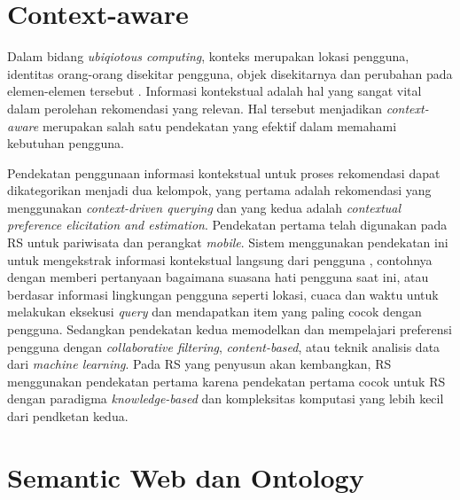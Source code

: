 \section{Context-aware}

Dalam bidang \textit{ubiqiotous computing}, konteks merupakan lokasi pengguna, identitas orang-orang disekitar pengguna, objek disekitarnya dan perubahan pada elemen-elemen tersebut \cite{ricci2011book}. Informasi kontekstual adalah hal yang sangat vital dalam perolehan rekomendasi yang relevan. Hal tersebut menjadikan \textit{context-aware} merupakan salah satu pendekatan yang efektif dalam memahami kebutuhan pengguna.

Pendekatan penggunaan informasi kontekstual untuk proses rekomendasi dapat dikategorikan menjadi dua kelompok, yang pertama adalah rekomendasi yang menggunakan \textit{context-driven querying} dan yang kedua adalah \textit{contextual preference elicitation and estimation}\cite{ricci2011book}. Pendekatan pertama telah digunakan pada RS untuk pariwisata dan perangkat \textit{mobile}. Sistem menggunakan pendekatan ini untuk mengekstrak informasi kontekstual langsung dari pengguna \cite{van2004context}\cite{abowd1997cyberguide}, contohnya dengan memberi pertanyaan bagaimana suasana hati pengguna saat ini, atau berdasar informasi lingkungan pengguna seperti lokasi, cuaca dan waktu untuk melakukan eksekusi \textit{query} dan mendapatkan item yang paling cocok dengan pengguna. Sedangkan pendekatan kedua memodelkan dan mempelajari preferensi pengguna dengan \textit{collaborative filtering}, \textit{content-based}, atau teknik analisis data dari \textit{machine learning}. Pada RS yang penyusun akan kembangkan, RS menggunakan pendekatan pertama karena pendekatan pertama cocok untuk RS dengan paradigma \textit{knowledge-based} \cite{ricci2011book} dan kompleksitas komputasi yang lebih kecil dari pendketan kedua.

\section{Semantic Web dan Ontology}

